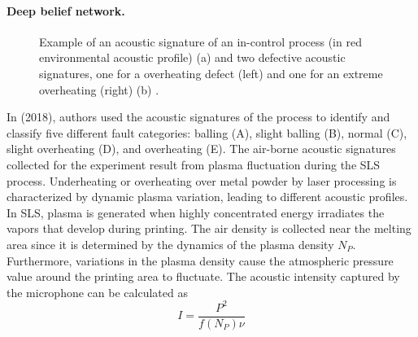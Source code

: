 \paragraph{Deep belief network.}
\begin{figure}
    \centering
    \quad
    \caption[Acoustics process signatures.]{Example of an acoustic signature of an in-control process (in red environmental acoustic profile) (a) and two defective acoustic signatures, one for a overheating defect (left) and one for an extreme overheating (right) (b) \cite{ye_defect_2018}.}    
\end{figure}
In \citeauthor{ye_defect_2018} (2018), authors used the acoustic signatures of the process to identify and classify five different fault categories: balling (A), slight balling (B), normal (C), slight overheating (D), and overheating (E). The air-borne acoustic signatures collected for the experiment result from plasma fluctuation during the SLS process. Underheating or overheating over metal powder by laser processing is characterized by dynamic plasma variation, leading to different acoustic profiles. In SLS, plasma is generated when highly concentrated energy irradiates the vapors that develop during printing. The air density is collected near the melting area since it is determined by the dynamics of the plasma density $N_P$. Furthermore, variations in the plasma density cause the atmospheric pressure value around the printing area to fluctuate. The acoustic intensity captured by the microphone can be calculated as
\begin{equation}
I = \frac{P^2}{f(N_P)\nu}
\end{equation}
